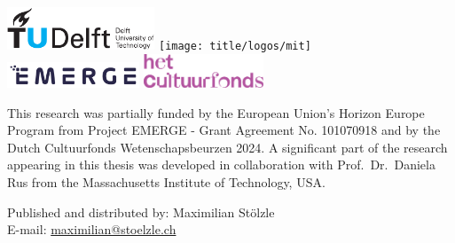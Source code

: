 \begin{titlepage}
\begin{tabular}{p{4.5cm}l}
\end{tabular}



\begin{center}
    \includegraphics[height=0.5in]{title/logos/tudelft}
    \hspace{3em}
    \texttt{[image: title/logos/mit]}\\
    \vspace{0.5em}
    \includegraphics[height=0.3in]{title/logos/emerge}
    \hspace{3em}
    \includegraphics[height=0.4in]{title/logos/cultuurfonds}
\end{center}
\vfill

\noindent This research was partially funded by the European Union’s Horizon Europe Program from Project EMERGE - Grant Agreement No. 101070918 and by the Dutch Cultuurfonds Wetenschapsbeurzen 2024.
A significant part of the research appearing in this thesis was developed in collaboration with Prof.\ Dr.\ Daniela Rus from the Massachusetts Institute of Technology, USA.

\noindent Published and distributed by: Maximilian Stölzle\\
E-mail: \href{mailto:maximilian@stoelzle.ch}{maximilian@stoelzle.ch}\\


\end{titlepage}

